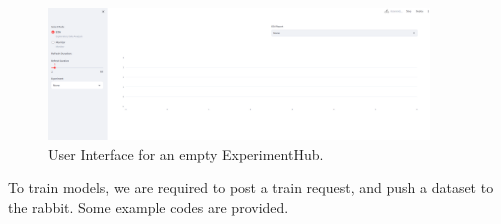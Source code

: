 \documentclass[preprint,12pt, a4paper]{elsarticle}
\begin{document}
\begin{figure}[h!]%
\includegraphics[width=0.9\textwidth, clip, trim={0 0 0 0}]{figs/empty_hub.png}
{\caption{User Interface for an empty ExperimentHub.}
\label{empty_hub}}
\end{figure}


To train models, we are required to post a train request, and push a dataset to the rabbit. Some example codes are provided.


\end{document}
